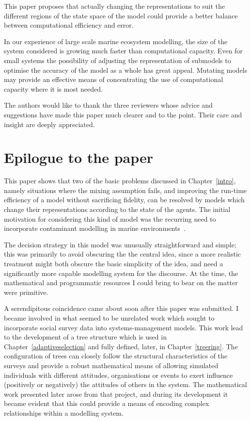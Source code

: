 This paper proposes that actually changing the representations to suit the
different regions of the state space of the model could provide a better
balance between computational efficiency and error.

In our experience of large scale marine ecosystem modelling, the size of the
system considered is growing much faster than computational capacity. Even for
small systems the possibility of adjusting the representation of submodels to
optimise the accuracy of the model as a whole has great appeal. Mutating
models may provide an effective means of concentrating the use of
computational capacity where it is most needed.


The authors would like to thank the three reviewers whose advice and
suggestions have made this paper much clearer and to the point. Their care and
insight are deeply appreciated.
\pagebreak

\section{Epilogue to the paper}

This paper shows that two of the basic problems discussed in Chapter~\ref{intro},
namely situations where the mixing assumption fails, and improving the
run-time efficiency of a model without sacrificing fidelity, can be
resolved by models which change their representations according to the
state of the agents.  The
initial motivation for considering this kind of model was the
recurring need to incorporate contaminant modelling in marine
environments~\cite{Lyne1994pmez5, gray2006nws, grayningaloo}. 

The decision strategy in this model was unusually straightforward and
simple; this was primarily to avoid obscuring the the central idea,
since a more realistic treatment might both obscure the basic
simplicity of the idea, and need a significantly more capable
modelling system for the discourse.  At the time, the mathematical and
programmatic resources I could bring to bear on the matter were
primitive.

A serendipitous coincidence came about soon after this paper was
submitted. I became involved in what seemed to be unrelated work which
sought to incorporate social survey data into systems-management
models. This work lead to the development of a tree structure which is
used in Chapter~\ref{adaptiveselection} and fully defined, later, in
Chapter~\ref{treering}. The configuration of trees can closely follow
the structural characteristics of the surveys and provide a robust
mathematical means of allowing simulated individuals with different
attitudes, organisations or events to exert influence (positively or
negatively) the attitudes of others in the system.  The mathematical
work presented later arose from that project, and during its
development it became evident that this could provide a means of
encoding complex relationships within a modelling system.







